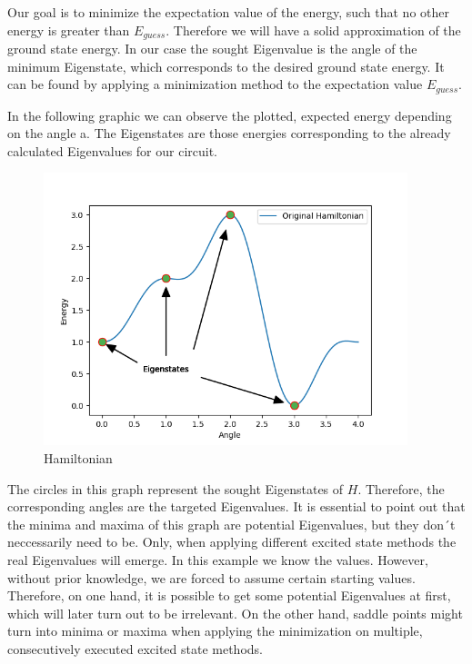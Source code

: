 \documentclass[
  letterpaper,
  DIV=11,
  numbers=noendperiod]{scrartcl}
\begin{document}
Our goal is to minimize the expectation value of the energy, such that
no other energy is greater than \(E_{guess}\). Therefore we will have a
solid approximation of the ground state energy. In our case the sought
Eigenvalue is the angle of the minimum Eigenstate, which corresponds to
the desired ground state energy. It can be found by applying a
minimization method to the expectation value \(E_{guess}\).

In the following graphic we can observe the plotted, expected energy
depending on the angle a. The Eigenstates are those energies
corresponding to the already calculated Eigenvalues for our circuit.

\begin{figure}[H]

{\centering \includegraphics[width=4.16667in,height=\textheight]{Original_Hamiltonian.png}

}

\caption{Hamiltonian}

\end{figure}%

The circles in this graph represent the sought Eigenstates of \(H\).
Therefore, the corresponding angles are the targeted Eigenvalues. It is
essential to point out that the minima and maxima of this graph are
potential Eigenvalues, but they don´t neccessarily need to be. Only,
when applying different excited state methods the real Eigenvalues will
emerge. In this example we know the values. However, without prior
knowledge, we are forced to assume certain starting values. Therefore,
on one hand, it is possible to get some potential Eigenvalues at first,
which will later turn out to be irrelevant. On the other hand, saddle
points might turn into minima or maxima when applying the minimization
on multiple, consecutively executed excited state methods.
\end{document}

